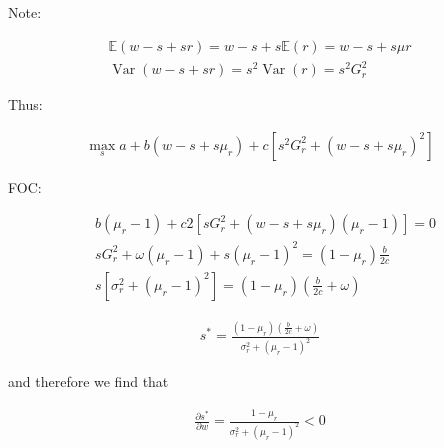 {{\begin{enumerate}[label=(\alph*)]
{Note: 

$$
\begin{aligned}
    \mathbb{E}(w-s+s r)=w-s+s \mathbb{E}(r)=w-s+s \mu r \\
    \operatorname{Var}(w-s+s r)=s^{2} \operatorname{Var}(r)=s^{2} G_{r}^{2}
\end{aligned}
$$

Thus:

\begin{align*}
\max _s a+b\left(w-s+s \mu_r\right)+c\left[s^2 G_r^2+\left(w-s+s \mu_r\right)^2\right]
\end{align*}

FOC:

\begin{align*}
    & b\left(\mu_r-1\right)+c 2\left[s G_r^2+\left(w-s+s \mu_r\right)\left(\mu_r-1\right)\right]=0 \\
    & s G_r^2+\omega\left(\mu_r-1\right)+s\left(\mu_r-1\right)^2=\left(1-\mu_r\right) \frac{b}{2 c} \\
    & s\left[\sigma_r^2+\left(\mu_r-1\right)^2\right]=\left(1-\mu_r\right)\left(\frac{b}{2 c}+\omega\right)
\end{align*}

\begin{align*}
s^*=\frac{\left(1-\mu_r\right)\left(\frac{b}{2 c}+\omega\right)}{\sigma_r^2+\left(\mu_r-1\right)^2}
\end{align*}

and therefore we find that

\begin{align*}
\frac{\partial s^*}{\partial w}=\frac{1-\mu_r}{\sigma_r^2+\left(\mu_r-1\right)^2}<0
\end{align*}
}
\end{enumerate}
}
}


